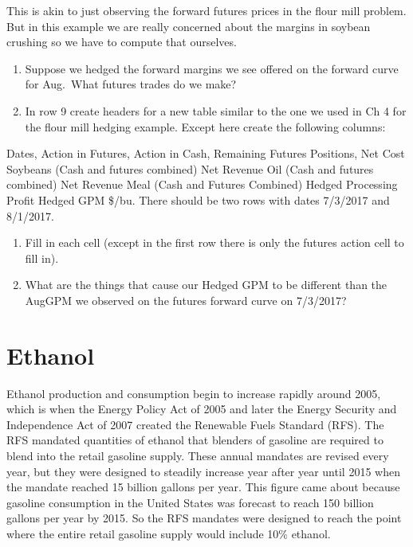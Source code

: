 \documentclass[
]{book}
\begin{document}
This is akin to just observing the forward futures prices in the flour mill problem. But in this example we are really concerned about the margins in soybean crushing so we have to compute that ourselves.

\begin{enumerate}
\def\labelenumi{\arabic{enumi}.}
\setcounter{enumi}{1}
\item
  Suppose we hedged the forward margins we see offered on the forward curve for Aug.~What futures trades do we make?
\item
  In row 9 create headers for a new table similar to the one we used in Ch 4 for the flour mill hedging example. Except here create the following columns:
\end{enumerate}

Dates, Action in Futures, Action in Cash, Remaining Futures Positions, Net Cost Soybeans (Cash and futures combined) Net Revenue Oil (Cash and futures combined) Net Revenue Meal (Cash and Futures Combined) Hedged Processing Profit Hedged GPM \$/bu. There should be two rows with dates 7/3/2017 and 8/1/2017.

\begin{enumerate}
\def\labelenumi{\arabic{enumi}.}
\setcounter{enumi}{3}
\item
  Fill in each cell (except in the first row there is only the futures action cell to fill in).
\item
  What are the things that cause our Hedged GPM to be different than the AugGPM we observed on the futures forward curve on 7/3/2017?
\end{enumerate}

\hypertarget{ethanol}{%
\chapter{Ethanol}\label{ethanol}}

Ethanol production and consumption begin to increase rapidly around 2005, which is when the Energy Policy Act of 2005 and later the Energy Security and Independence Act of 2007 created the Renewable Fuels Standard (RFS). The RFS mandated quantities of ethanol that blenders of gasoline are required to blend into the retail gasoline supply. These annual mandates are revised every year, but they were designed to steadily increase year after year until 2015 when the mandate reached 15 billion gallons per year. This figure came about because gasoline consumption in the United States was forecast to reach 150 billion gallons per year by 2015. So the RFS mandates were designed to reach the point where the entire retail gasoline supply would include 10\% ethanol.
\end{document}
